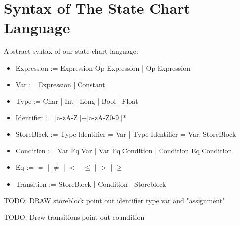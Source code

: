 \section{Syntax of The State Chart Language}

Abstract syntax of our state chart language:

\begin{itemize}
	\item Expression := Expression Op Expression | Op Expression
	\item Var := Expression | Constant
	\item Type := Char | Int | Long | Bool | Float
	\item Identifier := [a-zA-Z$\_$]+[a-zA-Z0-9$\_$]*  
	
	\item StoreBlock := Type Identifier = Var | Type Identifier = Var; StoreBlock

	\item Condition := Var Eq Var | Var Eq Condition | Condition Eq Condition
	
	\item Eq := $=$ | $\neq$ | $<$ | $\leq$ | $>$ | $\geq$	
	
	\item Transition := StoreBlock | Condition | Storeblock
	
\end{itemize}

TODO: DRAW storeblock point out identifier type var and "assignment"

TODO: Draw transitions point out coundition

